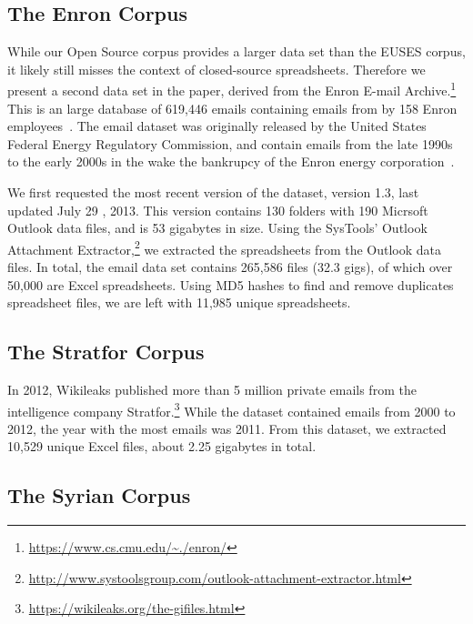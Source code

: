 \documentclass[conference]{IEEEtran}
\begin{document}

\subsection{The Enron Corpus}

While our Open Source corpus provides a larger data set than the EUSES corpus, 
it likely still misses the context of closed-source spreadsheets. 
Therefore we present a second data set in the paper, derived from
the Enron E-mail Archive.\footnote{\url{https://www.cs.cmu.edu/~./enron/}} 
This is an large database of 619,446 emails
containing emails from by 158 Enron employees~\cite{klimt2004introducing}.
The email dataset was originally released by the United States 
Federal Energy Regulatory Commission, and contain emails from the 
late 1990s to the early 2000s in the wake the bankrupcy of the Enron
energy corporation~\cite{grieve}.

We first requested the most recent version of the dataset, 
version 1.3, last updated July 29 , 2013. This version contains 130
folders with 190 Micrsoft Outlook data files, and is 53 gigabytes in size.
Using the SysTools' Outlook Attachment 
Extractor,\footnote{\url{http://www.systoolsgroup.com/outlook-attachment-extractor.html}} 
we extracted the spreadsheets from the Outlook data files. 
In total, the email data set
contains 265,586 files (32.3 gigs), of which over 50,000 are Excel spreadsheets. 
Using MD5 hashes to find and remove duplicates spreadsheet files,
we are left with 11,985 unique spreadsheets.

\subsection{The Stratfor Corpus}

In 2012, Wikileaks published more than 5 million private emails from the
intelligence company Stratfor.\footnote{\url{https://wikileaks.org/the-gifiles.html}}
While the dataset contained emails from 2000 to 2012, 
the year with the most emails was 2011.
From this dataset, we extracted 10,529 
unique Excel files, about 2.25 gigabytes in total.

\subsection{The Syrian Corpus}
\end{document}
